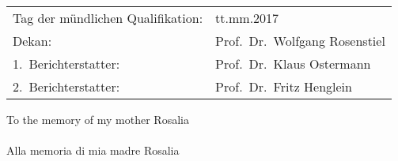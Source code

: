 \vspace{\dimexpr \bigskipamount * 3 \relax}
%
\begin{tabular}{@{}ll@{}}
Tag der mündlichen Qualifikation: & tt.mm.2017\\
Dekan:               & Prof.\ Dr.\ Wolfgang Rosenstiel\\
1.\ Berichterstatter: & Prof.\ Dr.\ Klaus Ostermann\\
2.\ Berichterstatter: & Prof.\ Dr.\ Fritz Henglein
\end{tabular}
%
\vspace{-1cm} %
\cleardoublepage
{%
\begin{flushright}
  \null{}
  To the memory of my mother Rosalia\\
  ~\\
  Alla memoria di mia madre Rosalia

  \null
\end{flushright}}
